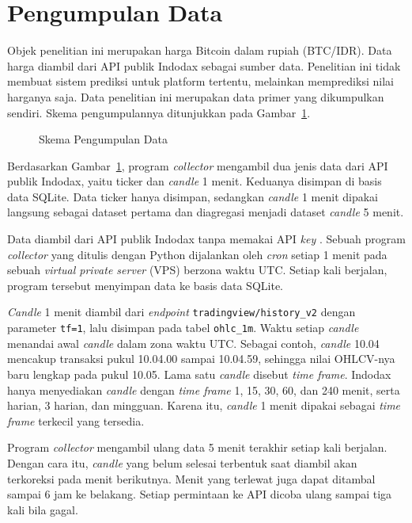 \section{Pengumpulan Data}
\label{sec:kumpul}
Objek penelitian ini merupakan harga Bitcoin dalam rupiah (BTC/IDR). Data
harga diambil dari API publik Indodax sebagai sumber data. Penelitian ini
tidak membuat sistem prediksi untuk platform tertentu, melainkan memprediksi
nilai harganya saja. Data penelitian ini merupakan data primer yang
dikumpulkan sendiri. Skema pengumpulannya ditunjukkan pada Gambar~\ref{fig:kumpul}.

\begin{figure}[!htbp]
  \centering
  \caption{Skema Pengumpulan Data}
  \label{fig:kumpul}
\end{figure}
Berdasarkan Gambar~\ref{fig:kumpul}, program \textit{collector} mengambil
dua jenis data dari API publik Indodax, yaitu ticker dan \textit{candle}
1 menit. Keduanya disimpan di basis data SQLite. Data ticker hanya disimpan,
sedangkan \textit{candle} 1 menit dipakai langsung sebagai dataset pertama dan
diagregasi menjadi dataset \textit{candle} 5 menit.

Data diambil dari API publik Indodax tanpa memakai API \textit{key}
\cite{indodaxapi}. Sebuah
program \textit{collector} yang ditulis dengan Python dijalankan oleh
\textit{cron} setiap 1 menit pada sebuah \textit{virtual private server} (VPS)
berzona waktu UTC. Setiap kali berjalan, program tersebut menyimpan data ke
basis data SQLite.

\textit{Candle} 1 menit diambil dari \textit{endpoint}
\texttt{tradingview/history\_v2} dengan parameter \texttt{tf=1}, lalu disimpan
pada tabel \texttt{ohlc\_1m}. Waktu setiap \textit{candle} menandai awal
\textit{candle} dalam zona waktu UTC. Sebagai contoh, \textit{candle} 10.04
mencakup transaksi pukul 10.04.00 sampai 10.04.59, sehingga nilai OHLCV-nya
baru lengkap pada pukul 10.05. Lama satu \textit{candle} disebut
\textit{time frame}. Indodax hanya menyediakan \textit{candle} dengan
\textit{time frame} 1, 15, 30, 60, dan 240 menit, serta harian, 3 harian, dan mingguan.
Karena itu, \textit{candle} 1 menit dipakai sebagai \textit{time frame}
terkecil yang tersedia.

Program \textit{collector} mengambil ulang data 5 menit terakhir setiap kali
berjalan. Dengan cara itu, \textit{candle} yang belum selesai terbentuk saat
diambil akan terkoreksi pada menit berikutnya. Menit yang terlewat juga dapat
ditambal sampai 6 jam ke belakang. Setiap permintaan ke API dicoba ulang
sampai tiga kali bila gagal.

